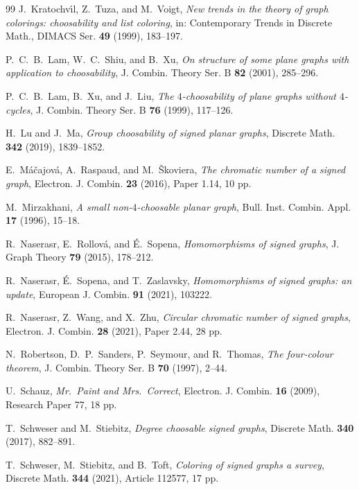 \documentclass[11pt,a4paper]{article}
\theoremstyle{plain}
\theoremstyle{definition}
\begin{document}
\begin{thebibliography}{99}
J.~Kratochv\'\i{}l, Z.~Tuza, and M.~Voigt,
\emph{New trends in the theory of graph colorings: choosability and list coloring},
in: Contemporary Trends in Discrete Math.,
DIMACS Ser. \textbf{49} (1999), 183--197.

P.~C.~B.~Lam, W.~C.~Shiu, and B.~Xu,
\emph{On structure of some plane graphs with application to choosability},
J. Combin. Theory Ser. B \textbf{82} (2001), 285--296.

P.~C.~B.~Lam, B.~Xu, and J.~Liu,
\emph{The $4$-choosability of plane graphs without $4$-cycles},
J. Combin. Theory Ser. B \textbf{76} (1999), 117--126.

H.~Lu and J.~Ma,
\emph{Group choosability of signed planar graphs},
Discrete Math. \textbf{342} (2019), 1839--1852.

E.~M\'a\v{c}ajov\'a, A.~Raspaud, and M.~\v{S}koviera,
\emph{The chromatic number of a signed graph},
Electron. J. Combin. \textbf{23} (2016), Paper 1.14, 10 pp.

M.~Mirzakhani,
\emph{A small non-$4$-choosable planar graph},
Bull. Inst. Combin. Appl. \textbf{17} (1996), 15--18.

R.~Naserasr, E.~Rollov\'a, and \'E.~Sopena,
\emph{Homomorphisms of signed graphs},
J. Graph Theory \textbf{79} (2015), 178--212.

R.~Naserasr, \'E.~Sopena, and T.~Zaslavsky,
\emph{Homomorphisms of signed graphs: an update},
European J. Combin. \textbf{91} (2021), 103222.

R.~Naserasr, Z.~Wang, and X.~Zhu,
\emph{Circular chromatic number of signed graphs},
Electron. J. Combin. \textbf{28} (2021), Paper 2.44, 28 pp.

N.~Robertson, D.~P.~Sanders, P.~Seymour, and R.~Thomas,
\emph{The four-colour theorem},
J. Combin. Theory Ser. B \textbf{70} (1997), 2--44.

U.~Schauz,
\emph{Mr.\ Paint and Mrs.\ Correct},
Electron. J. Combin. \textbf{16} (2009), Research Paper 77, 18 pp.

T.~Schweser and M.~Stiebitz,
\emph{Degree choosable signed graphs},
Discrete Math. \textbf{340} (2017), 882--891.

T.~Schweser, M.~Stiebitz, and B.~Toft,
\emph{Coloring of signed graphs  a survey},
Discrete Math. \textbf{344} (2021), Article 112577, 17 pp.


\end{thebibliography}
\end{document}
